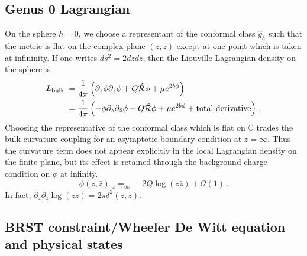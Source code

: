 \documentclass[a4paper]{article}
\begin{document}
\subsection{Genus 0 Lagrangian}
On the sphere $h=0$, we choose a representant of the conformal class $\hat{g}_h$ such that the metric is flat on the complex plane $(z,\bar{z})$ except at one point which is taken at infininity.
If one writes $ds^2 = 2 dz d\bar{z}$, then the Liouville Lagrangian density on the sphere is 
\begin{equation}
  \begin{aligned}
    L_{\rm bulk.} &= \frac{1}{4\pi}\left(\partial_z\phi \partial_{\bar{z}}\phi+Q \hat{\mathcal{R}}\phi+\mu e^{2b\phi}\right)\\
    &=\frac{1}{4\pi}\left(-\phi \partial_z\partial_{\bar{z}}\phi+Q \hat{\mathcal{R}}\phi+\mu e^{2b\phi}+\text{total derivative}\right)\,.
  \end{aligned}
\end{equation}
Choosing the representative of the conformal class which is flat on $\mathbb{C}$ trades the bulk curvature coupling for an asymptotic boundary condition at $z = \infty$. Thus the curvature term does not appear explicitly in the local Lagrangian density on the finite plane, but its effect is retained through the background-charge condition on $\phi$ at infinity.
\begin{equation}
  \phi(z,\bar{z}) \underset{z \to \infty}{=}  - 2Q \log (z\bar{z})+\mathcal{O}(1)\,.
\end{equation}
In fact, $\partial_z\partial_{\bar{z}}\log(z\bar{z}) = 2\pi \delta^2(z,\bar{z})$. \\
\subsection{BRST constraint/Wheeler De Witt equation and physical states}
\end{document}
